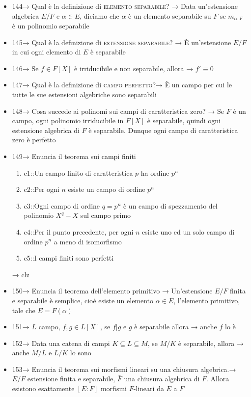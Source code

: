 \documentclass[A4,12pt]{article}
\renewcommand{\subset}{\subseteq}
\begin{document}
\begin{itemize}[noitemsep]
		\item 144→ Qual è la definizione di \textsc{elemento separabile}? → Data un'estensione algebrica $ E/F $ e $ \alpha \in E $, diciamo che $ \alpha $ è un elemento separabile su $ F $ se $ m_{\alpha,F} $ è un polinomio separabile
		\item 145→ Qual è la definizione di \textsc{estensione separabile}? → È un'estensione $ E/F $ in cui ogni elemento di $ E $ è separabile
		\item 146→ Se $ f\in F[X] $ è irriducibile e non separabile, allora → $ f'\equiv 0 $
		\item 147→ Qual è la definizione di \textsc{campo perfetto}?→ È un campo per cui le tutte le sue estensioni algebriche sono separabili
		\item 148→ Cosa succede ai polinomi sui campi di caratteristica zero? → Se $ F $ è un campo, ogni polinomio irriducibile in $ F[X] $ è separabile, quindi ogni estensione algebrica di $ F $ è separabile. Dunque ogni campo di caratteristica zero è perfetto
		\item 149→ Enuncia il teorema sui campi finiti \begin{enumerate}
			\item {{c1::Un campo finito di caratteristica $ p $ ha ordine $ p^n $}}
			\item {{c2::Per ogni $ n $ esiste un campo di ordine $ p^n $}}
			\item {{c3::Ogni campo di ordine $ q= p^n $ è un campo di spezzamento del polinomio $ X^q-X $ sul campo primo}}
			\item {{c4::Per il punto precedente, per ogni $ n $ esiste uno ed un solo campo di ordine $ p^n $ a meno di isomorfismo}}
			\item {{c5::I campi finiti sono perfetti}}
		\end{enumerate}→ clz
		\item 150→ Enuncia il teorema dell'elemento primitivo → Un'estensione $ E/F $ finita e separabile è semplice, cioè esiste un elemento $ \alpha \in E $, l'elemento primitivo, tale che $ E=F(\alpha) $
		\item 151→ $ L $ campo, $ f,g\in L[X] $, se $ f|g $ e $ g $ è separabile allora → anche $ f $ lo è
		\item 152→ Data una catena di campi $ K\subset L\subset M $, se $ M/K $ è separabile, allora → anche $ M/L $ e $ L/K $ lo sono
		\item 153→ Enuncia il teorema sui morfismi lineari su una chiusura algebrica.→ $ E/F $ estensione finita e separabile, $ \bar F $ una chiusura algebrica di $ F $. Allora esistono esattamente $ [E:F] $ morfismi $ F $-lineari da $ E $ a $ \bar F $

\end{itemize}
\end{document}
